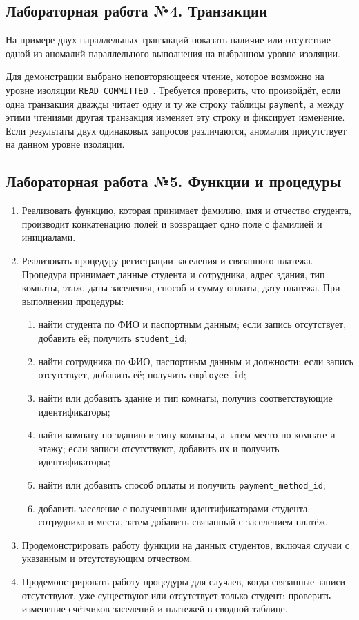 \subsection*{Лабораторная работа №4. Транзакции}
На примере двух параллельных транзакций показать наличие или отсутствие одной из аномалий параллельного выполнения на выбранном уровне изоляции.

Для демонстрации выбрано неповторяющееся чтение, которое возможно на уровне изоляции \texttt{READ COMMITTED}~\cite{pg-isolation}. Требуется проверить, что произойдёт, если одна транзакция дважды читает одну и ту же строку таблицы \texttt{payment}, а между этими чтениями другая транзакция изменяет эту строку и фиксирует изменение. Если результаты двух одинаковых запросов различаются, аномалия присутствует на данном уровне изоляции.

\subsection*{Лабораторная работа №5. Функции и процедуры}
\begin{enumerate}
    \item Реализовать функцию, которая принимает фамилию, имя и отчество студента, производит конкатенацию полей и возвращает одно поле с фамилией и инициалами.
    \item Реализовать процедуру регистрации заселения и связанного платежа. Процедура принимает данные студента и сотрудника, адрес здания, тип комнаты, этаж, даты заселения, способ и сумму оплаты, дату платежа. При выполнении процедуры:
    \begin{enumerate}[label=(\alph*)]
        \item найти студента по ФИО и паспортным данным; если запись отсутствует, добавить её; получить \texttt{student\_id};
        \item найти сотрудника по ФИО, паспортным данным и должности; если запись отсутствует, добавить её; получить \texttt{employee\_id};
        \item найти или добавить здание и тип комнаты, получив соответствующие идентификаторы;
        \item найти комнату по зданию и типу комнаты, а затем место по комнате и этажу; если записи отсутствуют, добавить их и получить идентификаторы;
        \item найти или добавить способ оплаты\newline
        и получить \texttt{payment\_method\_id};
        \item добавить заселение с полученными идентификаторами студента, сотрудника и места, затем добавить связанный с заселением платёж.
    \end{enumerate}
    \item Продемонстрировать работу функции на данных студентов, включая случаи с указанным и отсутствующим отчеством.
    \item Продемонстрировать работу процедуры для случаев, когда связанные записи отсутствуют, уже существуют или отсутствует только студент; проверить изменение счётчиков заселений и платежей в сводной таблице.
\end{enumerate}
